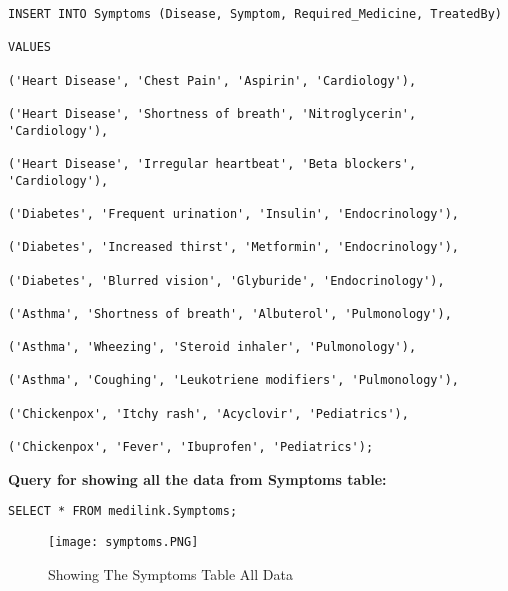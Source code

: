 \documentclass[11pt]{article}
\begin{document}
\begin{lstlisting}
INSERT INTO Symptoms (Disease, Symptom, Required_Medicine, TreatedBy) 

VALUES

('Heart Disease', 'Chest Pain', 'Aspirin', 'Cardiology'),

('Heart Disease', 'Shortness of breath', 'Nitroglycerin', 'Cardiology'),

('Heart Disease', 'Irregular heartbeat', 'Beta blockers', 'Cardiology'),

('Diabetes', 'Frequent urination', 'Insulin', 'Endocrinology'),

('Diabetes', 'Increased thirst', 'Metformin', 'Endocrinology'),

('Diabetes', 'Blurred vision', 'Glyburide', 'Endocrinology'),

('Asthma', 'Shortness of breath', 'Albuterol', 'Pulmonology'),

('Asthma', 'Wheezing', 'Steroid inhaler', 'Pulmonology'),

('Asthma', 'Coughing', 'Leukotriene modifiers', 'Pulmonology'),

('Chickenpox', 'Itchy rash', 'Acyclovir', 'Pediatrics'),

('Chickenpox', 'Fever', 'Ibuprofen', 'Pediatrics');

\end{lstlisting}
\textbf{Query for showing all the data from Symptoms table: }
\begin{lstlisting}
SELECT * FROM medilink.Symptoms;
\end{lstlisting}
\begin{figure}[H]
    \centering
    \texttt{[image: symptoms.PNG]}
    \caption{Showing The Symptoms Table All Data}
    \label{fig:1}
\end{figure}
\end{document}
